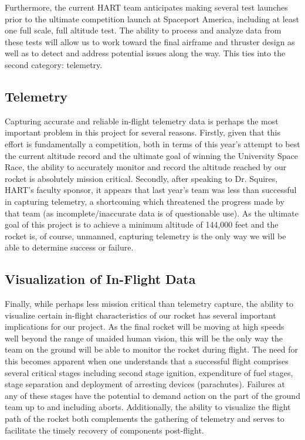 \documentclass[onecolumn, draftclsnofoot,10pt, compsoc]{IEEEtran}
\begin{document}
Furthermore, the current HART team anticipates making several test launches prior to the ultimate competition launch at Spaceport America, including at least one full scale, full altitude test. 
The ability to process and analyze data from these tests will allow us to work toward the final airframe and thruster design as well as to detect and address potential issues along the way. 
This ties into the second category: telemetry.

\subsection{Telemetry}
Capturing accurate and reliable in-flight telemetry data is perhaps the most important problem in this project for several reasons. 
Firstly, given that this effort is fundamentally a competition, both in terms of this year's attempt to best the current altitude record and the ultimate goal of winning the University Space Race, the ability to accurately monitor and record the altitude reached by our rocket is absolutely mission critical. 
Secondly, after speaking to Dr. Squires, HART's faculty sponsor, it appears that last year's team was less than successful in capturing telemetry, a shortcoming which threatened the progress made by that team (as incomplete/inaccurate data is of questionable use). 
As the ultimate goal of this project is to achieve a minimum altitude of 144,000 feet and the rocket is, of course, unmanned, capturing telemetry is the only way we will be able to determine success or failure.

\subsection{Visualization of In-Flight Data}
Finally, while perhaps less mission critical than telemetry capture, the ability to visualize certain in-flight characteristics of our rocket has several important implications for our project.
As the final rocket will be moving at high speeds well beyond the range of unaided human vision, this will be the only way the team on the ground will be able to monitor the rocket during flight. 
The need for this becomes apparent when one understands that a successful flight comprises several critical stages including second stage ignition, expenditure of fuel stages, stage separation and deployment of arresting devices (parachutes). 
Failures at any of these stages have the potential to demand action on the part of the ground team up to and including aborts. 
Additionally, the ability to visualize the flight path of the rocket both complements the gathering of telemetry and serves to facilitate the timely recovery of components post-flight. 
\end{document}
